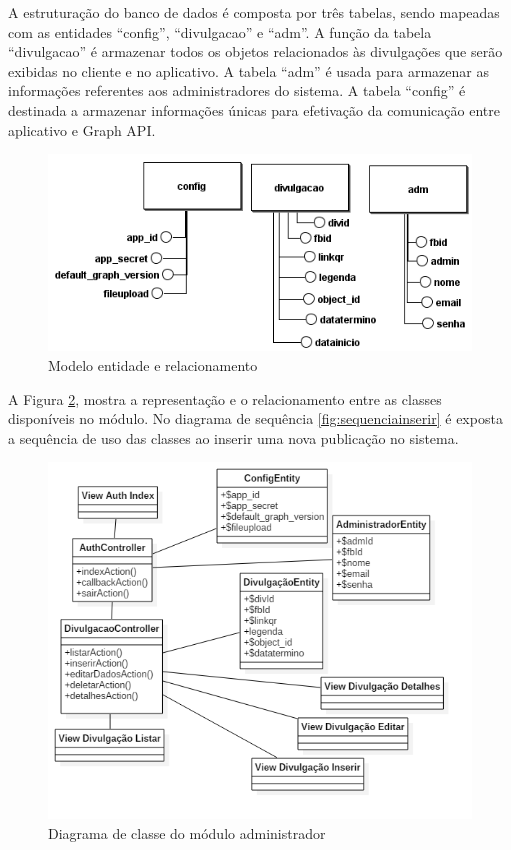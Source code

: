 A estruturação do banco de dados é composta por três tabelas, sendo mapeadas com as entidades ``config'', ``divulgacao'' e ``adm''. A função da tabela ``divulgacao'' é armazenar todos os objetos relacionados às divulgações que serão exibidas no cliente e no aplicativo. A tabela ``adm'' é usada para armazenar as informações referentes aos administradores do sistema. A tabela ``config'' é destinada a armazenar informações únicas para efetivação da comunicação entre aplicativo e Graph API.

\begin{figure}[H]
\centering
\includegraphics[width=\textwidth]{figuras/entidaderelacionamento}
\caption{Modelo entidade e relacionamento}
\label{fig:casosDeUso}
\end{figure}

A Figura \ref{fig:diagramaclasseADM}, mostra a representação e o relacionamento entre as classes disponíveis no módulo. No diagrama de sequência \ref{fig:sequenciainserir} é exposta a sequência de uso das classes ao inserir uma nova publicação no sistema. 
\begin{figure}[H]
\centering
\includegraphics[scale=0.7]{figuras/diagramaclasseADM}
\caption{Diagrama de classe do módulo administrador}
\label{fig:diagramaclasseADM}
\end{figure}

